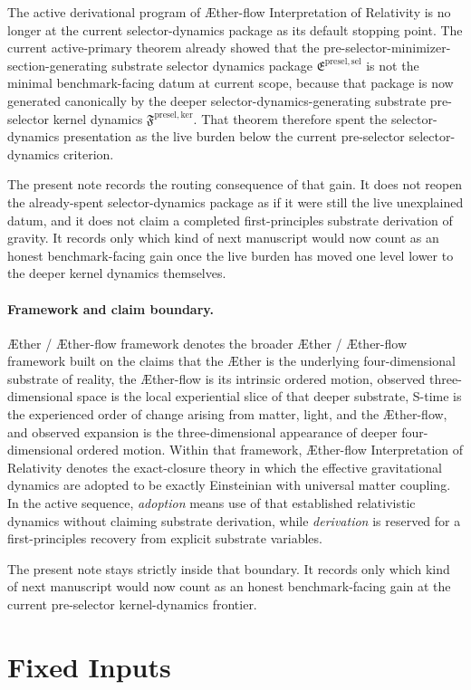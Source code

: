 \documentclass[11pt]{article}
\newcommand{\Aether}{\AE{}ther}
\newcommand{\Aflow}{\AE{}ther-flow}
\newcommand{\TheoryName}{\Aflow{} Interpretation of Relativity}
\newcommand{\TheoryProgram}{\Aether{} / \Aflow{} framework}
\newcommand{\KernelPackage}{\mathfrak F^{\mathrm{presel,ker}}}
\newcommand{\PreSectionSelectorPackage}{\mathfrak E^{\mathrm{presel,sel}}}
\begin{document}
The active derivational program of \TheoryName{} is no longer at the current selector-dynamics package as its default stopping point. The current active-primary theorem already showed that the pre-selector-minimizer-section-generating substrate selector dynamics package \(\PreSectionSelectorPackage\) is not the minimal benchmark-facing datum at current scope, because that package is now generated canonically by the deeper selector-dynamics-generating substrate pre-selector kernel dynamics \(\KernelPackage\). That theorem therefore spent the selector-dynamics presentation as the live burden below the current pre-selector selector-dynamics criterion.

The present note records the routing consequence of that gain. It does not reopen the already-spent selector-dynamics package as if it were still the live unexplained datum, and it does not claim a completed first-principles substrate derivation of gravity. It records only which kind of next manuscript would now count as an honest benchmark-facing gain once the live burden has moved one level lower to the deeper kernel dynamics themselves.

\paragraph{Framework and claim boundary.}
\TheoryProgram{} denotes the broader \Aether{} / \Aflow{} framework built on the claims that the \Aether{} is the underlying four-dimensional substrate of reality, the \Aflow{} is its intrinsic ordered motion, observed three-dimensional space is the local experiential slice of that deeper substrate, S-time is the experienced order of change arising from matter, light, and the \Aflow{}, and observed expansion is the three-dimensional appearance of deeper four-dimensional ordered motion. Within that framework, \TheoryName{} denotes the exact-closure theory in which the effective gravitational dynamics are adopted to be exactly Einsteinian with universal matter coupling. In the active sequence, \emph{adoption} means use of that established relativistic dynamics without claiming substrate derivation, while \emph{derivation} is reserved for a first-principles recovery from explicit substrate variables.

The present note stays strictly inside that boundary. It records only which kind of next manuscript would now count as an honest benchmark-facing gain at the current pre-selector kernel-dynamics frontier.

\section{Fixed Inputs}
\end{document}
